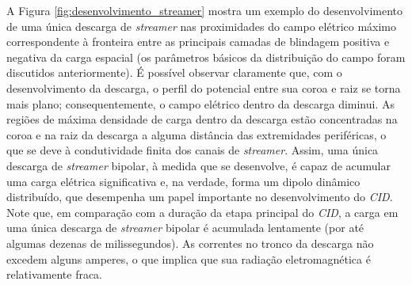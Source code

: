 \documentclass[a4paper, 12pt, onecolumn,singlespacing]{article}
\begin{document}
	A Figura \ref{fig:desenvolvimento_streamer} mostra um exemplo do desenvolvimento de uma única descarga de \textit{streamer} nas proximidades do campo elétrico máximo correspondente à fronteira entre as principais camadas de blindagem positiva e negativa da carga espacial (os parâmetros básicos da distribuição do campo foram discutidos anteriormente). É possível observar claramente que, com o desenvolvimento da descarga, o perfil do potencial entre sua coroa e raiz se torna mais plano; consequentemente, o campo elétrico dentro da descarga diminui. As regiões de máxima densidade de carga dentro da descarga estão concentradas na coroa e na raiz da descarga a alguma distância das extremidades periféricas, o que se deve à condutividade finita dos canais de \textit{streamer}. Assim, uma única descarga de \textit{streamer} bipolar, à medida que se desenvolve, é capaz de acumular uma carga elétrica significativa e, na verdade, forma um dipolo dinâmico distribuído, que desempenha um papel importante no desenvolvimento do \textit{CID}. Note que, em comparação com a duração da etapa principal do \textit{CID}, a carga em uma única descarga de \textit{streamer} bipolar é acumulada lentamente (por até algumas dezenas de milissegundos). As correntes no tronco da descarga não excedem alguns amperes, o que implica que sua radiação eletromagnética é relativamente fraca.
	
\end{document}
